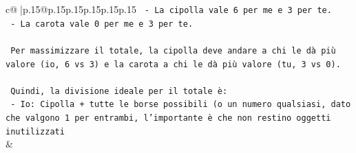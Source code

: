 \documentclass{article}
\begin{document}
{\begin{supertabular}{c@{$\;$}|p{.15\linewidth}@{}p{.15\linewidth}p{.15\linewidth}p{.15\linewidth}p{.15\linewidth}p{.15\linewidth}}
{{{\texttt{    {-} La cipolla vale 6 per me e 3 per te.} \\
\texttt{    {-} La carota vale 0 per me e 3 per te.} \\
\\ 
\texttt{    Per massimizzare il totale, la cipolla deve andare a chi le dà più valore (io, 6 vs 3) e la carota a chi le dà più valore (tu, 3 vs 0).} \\
\\ 
\texttt{    Quindi, la divisione ideale per il totale è:} \\
\texttt{    {-} Io: Cipolla + tutte le borse possibili (o un numero qualsiasi, dato che valgono 1 per entrambi, l'importante è che non restino oggetti inutilizzati} \\
            }
        }
    }
    & \\ \\


\end{supertabular}}
\end{document}
